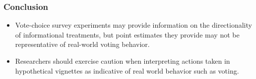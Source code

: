 \documentclass[usenames,dvipsnames]{beamer}
\begin{document}

\begin{frame}
\frametitle{Conclusion}
\begin{itemize}
\item Vote-choice survey experiments may provide information on the directionality of informational treatments, but point estimates they provide may not be representative of real-world voting behavior. 
\pause
\item Researchers should exercise caution when interpreting actions taken in hypothetical vignettes as indicative of real world behavior such as voting. 
\end{itemize}

\end{frame}





\end{document}
